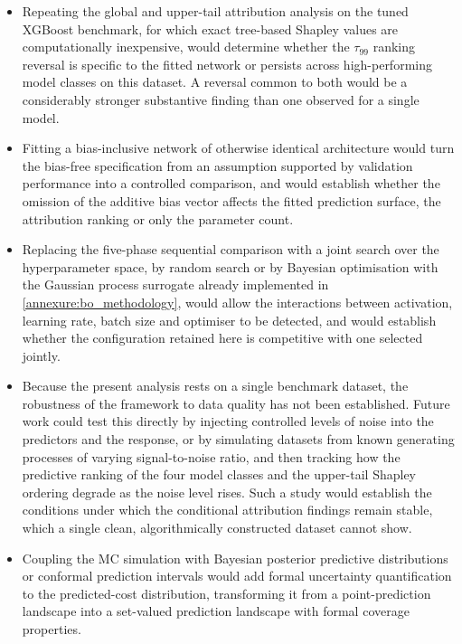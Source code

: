 \begin{itemize}
    \item Repeating the global and upper-tail attribution analysis on the
          tuned XGBoost benchmark, for which exact tree-based Shapley
          values are computationally inexpensive, would determine whether
          the $\tau_{99}$ ranking reversal is specific to the fitted
          network or persists across high-performing model classes on this
          dataset.  A reversal common to both would be a considerably
          stronger substantive finding than one observed for a single
          model.

    \item Fitting a bias-inclusive network of otherwise identical
          architecture would turn the bias-free specification from an
          assumption supported by validation performance into a controlled
          comparison, and would establish whether the omission of the
          additive bias vector affects the fitted prediction surface, the
          attribution ranking or only the parameter count.

    \item Replacing the five-phase sequential comparison with a joint
          search over the hyperparameter space, by random search or by
          Bayesian optimisation with the Gaussian process surrogate already
          implemented in \ref{annexure:bo_methodology}, would allow the
          interactions between activation, learning rate, batch size and
          optimiser to be detected, and would establish whether the
          configuration retained here is competitive with one selected
          jointly.

    \item Because the present analysis rests on a single benchmark
          dataset, the robustness of the framework to data quality has not
          been established.  Future work could test this directly by
          injecting controlled levels of noise into the predictors and the
          response, or by simulating datasets from known generating
          processes of varying signal-to-noise ratio, and then tracking how
          the predictive ranking of the four model classes and the
          upper-tail Shapley ordering degrade as the noise level rises.
          Such a study would establish the conditions under which the
          conditional attribution findings remain stable, which a single
          clean, algorithmically constructed dataset cannot show.

    \item Coupling the MC simulation with Bayesian posterior
          predictive distributions or conformal prediction intervals would
          add formal uncertainty quantification to the predicted-cost
          distribution, transforming it from a point-prediction landscape
          into a set-valued prediction landscape with formal coverage
          properties.


\end{itemize}
